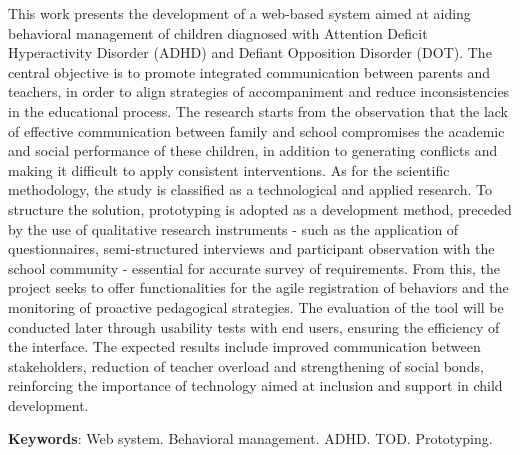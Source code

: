 
\begin{resumo}[ABSTRACT]

    \begin{SingleSpacing}
    
       This work presents the development of a web-based system aimed at aiding behavioral management of children diagnosed with Attention Deficit Hyperactivity Disorder (ADHD) and Defiant Opposition Disorder (DOT). The central objective is to promote integrated communication between parents and teachers, in order to align strategies of accompaniment and reduce inconsistencies in the educational process. The research starts from the observation that the lack of effective communication between family and school compromises the academic and social performance of these children, in addition to generating conflicts and making it difficult to apply consistent interventions. As for the scientific methodology, the study is classified as a technological and applied research. To structure the solution, prototyping is adopted as a development method, preceded by the use of qualitative research instruments - such as the application of questionnaires, semi-structured interviews and participant observation with the school community - essential for accurate survey of requirements. From this, the project seeks to offer functionalities for the agile registration of behaviors and the monitoring of proactive pedagogical strategies. The evaluation of the tool will be conducted later through usability tests with end users, ensuring the efficiency of the interface. The expected results include improved communication between stakeholders, reduction of teacher overload and strengthening of social bonds, reinforcing the importance of technology aimed at inclusion and support in child development.
        
        \item\textbf{Keywords}: Web system. Behavioral management. ADHD. TOD. Prototyping.
    
    \end{SingleSpacing}
    
\end{resumo}
